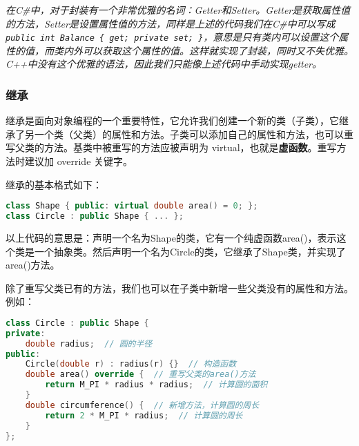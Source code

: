 \documentclass[../main.tex]{subfiles}
\begin{document}
\emph{
  在C\#中，对于封装有一个非常优雅的名词：Getter和Setter。Getter是获取属性值的方法，Setter是设置属性值的方法，同样是上述的代码我们在C\#中可以写成\texttt{public int Balance \{ get; private set; \}}，意思是只有类内可以设置这个属性的值，而类内外可以获取这个属性的值。这样就实现了封装，同时又不失优雅。C++中没有这个优雅的语法，因此我们只能像上述代码中手动实现getter。
}

\subsubsection{继承}

继承是面向对象编程的一个重要特性，它允许我们创建一个新的类（子类），它继承了另一个类（父类）的属性和方法。子类可以添加自己的属性和方法，也可以重写父类的方法。基类中被重写的方法应被声明为 virtual，也就是\textbf{虚函数}。重写方法时建议加 override 关键字。

继承的基本格式如下：
\begin{lstlisting}[language=C++]
class Shape { public: virtual double area() = 0; };
class Circle : public Shape { ... };
\end{lstlisting}
以上代码的意思是：声明一个名为Shape的类，它有一个纯虚函数area()，表示这个类是一个抽象类。然后声明一个名为Circle的类，它继承了Shape类，并实现了area()方法。

除了重写父类已有的方法，我们也可以在子类中新增一些父类没有的属性和方法。例如：
\begin{lstlisting}[language=C++]
class Circle : public Shape {
private:
    double radius;  // 圆的半径
public:
    Circle(double r) : radius(r) {}  // 构造函数
    double area() override {  // 重写父类的area()方法
        return M_PI * radius * radius;  // 计算圆的面积
    }
    double circumference() {  // 新增方法，计算圆的周长
        return 2 * M_PI * radius;  // 计算圆的周长
    }
};
\end{lstlisting}
\end{document}
